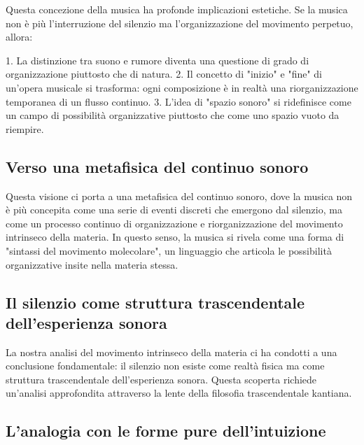 \documentclass[a4paper,11pt]{article}
\begin{document}
Questa concezione della musica ha profonde implicazioni estetiche. Se la
musica non è più l'interruzione del silenzio ma l'organizzazione del
movimento perpetuo, allora:

1. La distinzione tra suono e rumore diventa una questione di grado di
organizzazione piuttosto che di natura. 2. Il concetto di "inizio" e
"fine" di un'opera musicale si trasforma: ogni composizione è in
realtà una riorganizzazione temporanea di un flusso continuo. 3. L'idea
di "spazio sonoro" si ridefinisce come un campo di possibilità
organizzative piuttosto che come uno spazio vuoto da riempire.

\subsection{Verso una metafisica del continuo sonoro}\hypertarget{verso-una-metafisica-del-continuo-sonoro}{}\label{verso-una-metafisica-del-continuo-sonoro}

Questa visione ci porta a una metafisica del continuo sonoro, dove la
musica non è più concepita come una serie di eventi discreti che
emergono dal silenzio, ma come un processo continuo di organizzazione e
riorganizzazione del movimento intrinseco della materia. In questo
senso, la musica si rivela come una forma di "sintassi del movimento
molecolare", un linguaggio che articola le possibilità organizzative
insite nella materia stessa.

\subsection{Il silenzio come struttura trascendentale dell'esperienza sonora}\hypertarget{il-silenzio-come-struttura-trascendentale-dellesperienza-sonora}{}\label{il-silenzio-come-struttura-trascendentale-dellesperienza-sonora}

La nostra analisi del movimento intrinseco della materia ci ha condotti
a una conclusione fondamentale: il silenzio non esiste come realtà
fisica ma come struttura trascendentale dell'esperienza sonora. Questa
scoperta richiede un'analisi approfondita attraverso la lente della
filosofia trascendentale kantiana.

\subsection{L'analogia con le forme pure dell'intuizione}\hypertarget{lanalogia-con-le-forme-pure-dellintuizione}{}\label{lanalogia-con-le-forme-pure-dellintuizione}
\end{document}
